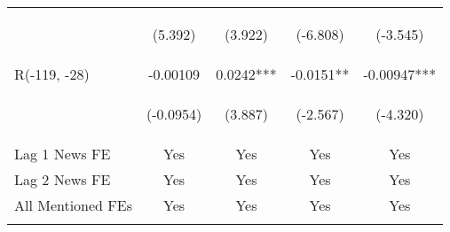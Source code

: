 \documentclass[border=0.2cm]{standalone}
\begin{document}
\begin{tabular}{lcccc}
    \vspace{4pt}      & \begin{footnotesize}(5.392)\end{footnotesize}   & \begin{footnotesize}(3.922)\end{footnotesize}  & \begin{footnotesize}(-6.808)\end{footnotesize} & \begin{footnotesize}(-3.545)\end{footnotesize} \\
    R(-119, -28)      & -0.00109                                        & 0.0242***                                      & -0.0151**                                      & -0.00947***                                    \\
    \vspace{4pt}      & \begin{footnotesize}(-0.0954)\end{footnotesize} & \begin{footnotesize}(3.887)\end{footnotesize}  & \begin{footnotesize}(-2.567)\end{footnotesize} & \begin{footnotesize}(-4.320)\end{footnotesize} \\
    Lag 1 News FE     & Yes                                             & Yes                                            & Yes                                            & Yes                                            \\
    Lag 2 News FE     & Yes                                             & Yes                                            & Yes                                            & Yes                                            \\
    All Mentioned FEs & Yes                                             & Yes                                            & Yes                                            & Yes                                            \\
    \vspace{4pt}      & \begin{footnotesize}\end{footnotesize}          & \begin{footnotesize}\end{footnotesize}         & \begin{footnotesize}\end{footnotesize}         & \begin{footnotesize}\end{footnotesize}         \\

\end{tabular}
\end{document}
